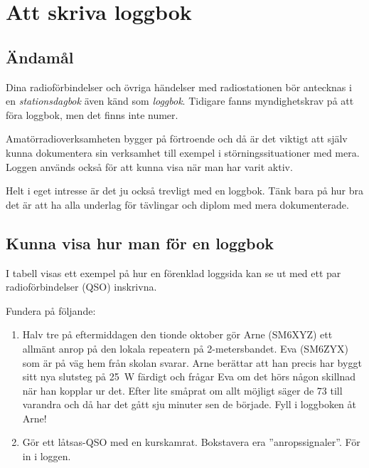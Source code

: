 \chapter{Att skriva loggbok}


\section{Ändamål}

Dina radioförbindelser och övriga händelser med radiostationen bör antecknas i
en \emph{stationsdagbok} även känd som \emph{loggbok}.
Tidigare fanns myndighetskrav på att föra loggbok, men det finns inte numer.

Amatörradioverksamheten bygger på förtroende och då är det viktigt att själv
kunna dokumentera sin verksamhet till exempel i störningssituationer med mera.
Loggen används också för att kunna visa när man har varit aktiv.

Helt i eget intresse är det ju också trevligt med en loggbok.
Tänk bara på hur bra det är att ha alla underlag för tävlingar och diplom med
mera dokumenterade.

\section{Kunna visa hur man för en loggbok}

I tabell  visas ett exempel på hur en förenklad loggsida kan
se ut med ett par radioförbindelser (QSO) inskrivna.

Fundera på följande:
\begin{enumerate}
\item Halv tre på eftermiddagen den tionde oktober gör Arne (SM6XYZ)
  ett allmänt anrop på den lokala repeatern på 2-metersbandet.
  Eva (SM6ZYX) som är på väg hem från skolan svarar.
  Arne berättar att han precis har byggt sitt nya slutsteg på \SI{25}{\watt}
  färdigt och frågar Eva om det hörs någon skillnad när han kopplar ur det.
  Efter lite småprat om allt möjligt säger de 73 till varandra och då har det
  gått sju minuter sen de började.
  Fyll i loggboken åt Arne!
\item Gör ett låtsas-QSO med en kurskamrat.
  Bokstavera era ''anropssignaler''.
  För in i loggen.
\end{enumerate}

